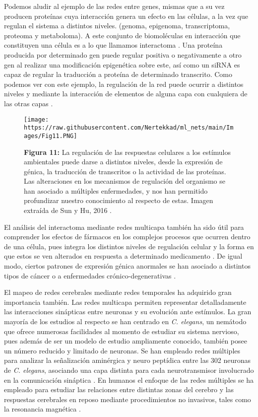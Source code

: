 \documentclass[
]{book}
\begin{document}
Podemos aludir al ejemplo de las redes entre genes, mismas que a su vez producen proteínas cuya interacción genera un efecto en las células, a la vez que regulan el sistema a distintos niveles. (genoma, epigenoma, transcriptoma, proteoma y metaboloma). A este conjunto de biomoléculas en interacción que constituyen una célula es a lo que llamamos interactoma \citep{aleta2019multilayer}. Una proteína producida por determinado gen puede regular positiva o negativamente a otro gen al realizar una modificación epigenética sobre este, así como un siRNA es capaz de regular la traducción a proteína de determinado transcrito. Como podemos ver con este ejemplo, la regulación de la red puede ocurrir a distintos niveles y mediante la interacción de elementos de alguna capa con cualquiera de las otras capas \citep{sun2016integrative}.

\begin{figure}
\centering
\texttt{[image: https://raw.githubusercontent.com/Nertekkad/ml\_nets/main/Images/Fig11.PNG]}
\caption{\textbf{Figura 11:} La regulación de las respuestas celulares a los estímulos ambientales puede darse a distintos niveles, desde la expresión de génica, la traducción de transcritos o la actividad de las proteínas. Las alteraciones en los mecanismos de regulación del organismo se han asociado a múltiples enfermedades, y nos han permitido profundizar nuestro conocimiento al respecto de estas. Imagen extraída de Sun y Hu, 2016 \citep{sun2016integrative}.}
\end{figure}

El análisis del interactoma mediante redes multicapa también ha sido útil para comprender los efectos de fármacos en los complejos procesos que ocurren dentro de una célula, pues integra los distintos niveles de regulación celular y la forma en que estos se ven alterados en respuesta a determinado medicamento \citep{aleta2019multilayer}. De igual modo, ciertos patrones de expresión génica anormales se han asociado a distintos tipos de cáncer o a enfermedades crónico-degenerativas \citep{albert2002statistical}.

El mapeo de redes cerebrales mediante redes temporales ha adquirido gran importancia también. Las redes multicapa permiten representar detalladamente las interacciones sinápticas entre neuronas y su evolución ante estímulos. La gran mayoría de los estudios al respecto se han centrado en \emph{C. elegans}, un nemátodo que ofrece numerosas facilidades al momento de estudiar su sistema nervioso, pues además de ser un modelo de estudio ampliamente conocido, también posee un número reducido y limitado de neuronas. Se han empleado redes múltiples para analizar la señalización aminérgica y neuro peptídica entre las 302 neuronas de \emph{C. elegans}, asociando una capa distinta para cada neurotransmisor involucrado en la comunicación sináptica \citep{bentley2016multilayer}. En humanos el enfoque de las redes múltiples se ha empleado para estudiar las relaciones entre distintas zonas del cerebro y las respuestas cerebrales en reposo mediante procedimientos no invasivos, tales como la resonancia magnética \citep{del2016synchronization}.
\end{document}
